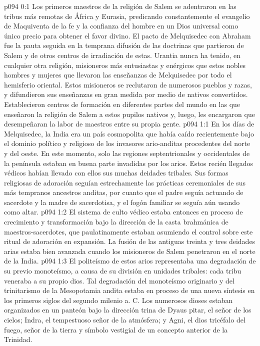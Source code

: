 \author{Melquisedec}
\vs p094 0:1 Los primeros maestros de la religión de Salem se adentraron en las tribus más remotas de África y Eurasia, predicando constantemente el evangelio de Maquiventa de la fe y la confianza del hombre en un Dios universal como único precio para obtener el favor divino. El pacto de Melquisedec con Abraham fue la pauta seguida en la temprana difusión de las doctrinas que partieron de Salem y de otros centros de irradiación de estas. Urantia nunca ha tenido, en cualquier otra religión, misioneros más entusiastas y enérgicos que estos nobles hombres y mujeres que llevaron las enseñanzas de Melquisedec por todo el hemisferio oriental. Estos misioneros se reclutaron de numerosos pueblos y razas, y difundieron sus enseñanzas en gran medida por medio de nativos convertidos. Establecieron centros de formación en diferentes partes del mundo en las que enseñaron la religión de Salem a estos pupilos nativos y, luego, les encargaron que desempeñaran la labor de maestros entre su propia gente.
\vs p094 1:1 En los días de Melquisedec, la India era un país cosmopolita que había caído recientemente bajo el dominio político y religioso de los invasores ario\hyp{}anditas procedentes del norte y del oeste. En este momento, solo las regiones septentrionales y occidentales de la península estaban en buena parte invadidas por los arios. Estos recién llegados védicos habían llevado con ellos sus muchas deidades tribales. Sus formas religiosas de adoración seguían estrechamente las prácticas ceremoniales de sus más tempranos ancestros anditas, por cuanto que el padre seguía actuando de sacerdote y la madre de sacerdotisa, y el fogón familiar se seguía aún usando como altar.
\vs p094 1:2 El sistema de culto védico estaba entonces en proceso de crecimiento y transformación bajo la dirección de la casta brahmánica de maestros\hyp{}sacerdotes, que paulatinamente estaban asumiendo el control sobre este ritual de adoración en expansión. La fusión de las antiguas treinta y tres deidades arias estaba bien avanzada cuando los misioneros de Salem penetraron en el norte de la India.
\vs p094 1:3 El politeísmo de estos arios representaba una degradación de su previo monoteísmo, a causa de su división en unidades tribales: cada tribu veneraba a su propio dios. Tal degradación del monoteísmo originario y del trinitarismo de la Mesopotamia andita estaba en proceso de una nueva síntesis en los primeros siglos del segundo milenio a. C. Los numerosos dioses estaban organizados en un panteón bajo la dirección trina de Dyaus pitar, el señor de los cielos; Indra, el tempestuoso señor de la atmósfera; y Agni, el dios tricéfalo del fuego, señor de la tierra y símbolo vestigial de un concepto anterior de la Trinidad.
